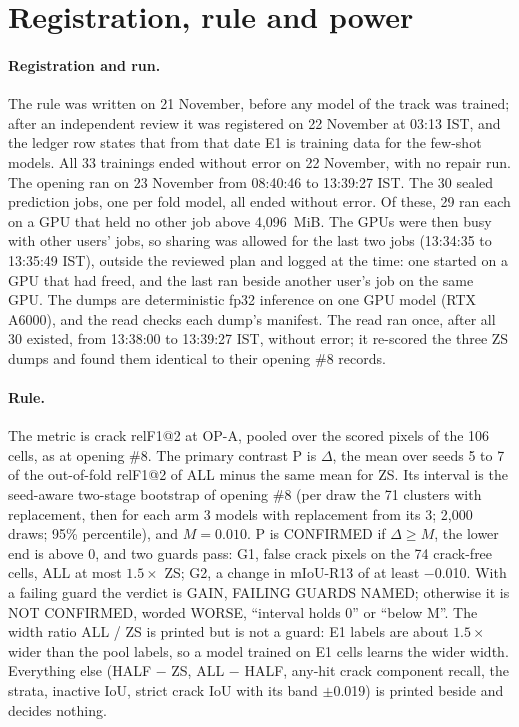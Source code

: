 \section{Registration, rule and power}\label{sec:t3b-rule}

\paragraph{Registration and run.} The rule was written on 21 November, before any model of the track was trained; after an independent
review it was registered on 22 November at 03:13 IST, and the ledger row states that from that date E1 is training data for the few-shot models. All 33
trainings ended without error on 22 November, with no repair run. The opening ran on 23 November from 08:40:46 to 13:39:27 IST.
The 30 sealed prediction jobs, one per fold model, all ended without error. Of these, 29 ran each on a GPU that held no other job above
4,096~MiB. The GPUs were then busy with other users' jobs, so sharing was allowed for the last two jobs (13:34:35 to 13:35:49 IST),
outside the reviewed plan and logged at the time: one started on a GPU that had freed, and the last ran beside another user's job on
the same GPU. The dumps are deterministic fp32 inference on one GPU model (RTX A6000), and the read checks each dump's manifest. The
read ran once, after all 30 existed, from 13:38:00 to 13:39:27 IST, without error; it re-scored the three ZS dumps and found them
identical to their opening \#8 records.

\paragraph{Rule.} The metric is crack relF1@2 at OP-A, pooled over the scored pixels of the 106 cells, as at opening \#8. The
primary contrast P is $\Delta$, the mean over seeds 5 to 7 of the out-of-fold relF1@2 of ALL minus the same mean for ZS. Its
interval is the seed-aware two-stage bootstrap of opening \#8 (per draw the 71 clusters with replacement, then for each arm 3 models
with replacement from its 3; 2,000 draws; 95\% percentile), and $M=0.010$. P is CONFIRMED if $\Delta\geq M$, the lower end is
above 0, and two guards pass: G1, false crack pixels on the 74 crack-free cells, ALL at most $1.5\times$ ZS; G2, a change in
mIoU-R13 of at least $-$0.010. With a failing guard the verdict is GAIN, FAILING GUARDS NAMED; otherwise it is NOT CONFIRMED, worded
WORSE, ``interval holds 0'' or ``below M''. The width ratio ALL / ZS is printed but is not a guard: E1 labels are about $1.5\times$
wider than the pool labels, so a model trained on E1 cells learns the wider width. Everything else (HALF $-$ ZS, ALL $-$ HALF,
any-hit crack component recall, the strata, inactive IoU, strict crack IoU with its band $\pm$0.019) is printed beside and decides
nothing.

